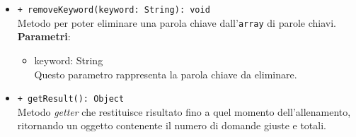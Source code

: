 \begin{itemize}
\begin{itemize}
				\item \texttt{+ removeKeyword(keyword: String): void} \\
				Metodo per poter eliminare una parola chiave dall'\texttt{array} di parole chiavi.\\
				\textbf{Parametri}:
				\begin{itemize}
					\item {keyword: String}\\
					Questo parametro rappresenta la parola chiave da eliminare.
				\end{itemize}
				
				\item \texttt{+ getResult(): Object} \\
				Metodo \textit{getter} che restituisce risultato fino a quel momento dell'allenamento, ritornando un oggetto contenente il numero di domande giuste e totali.
				
			\end{itemize}
		\end{itemize}
			
		